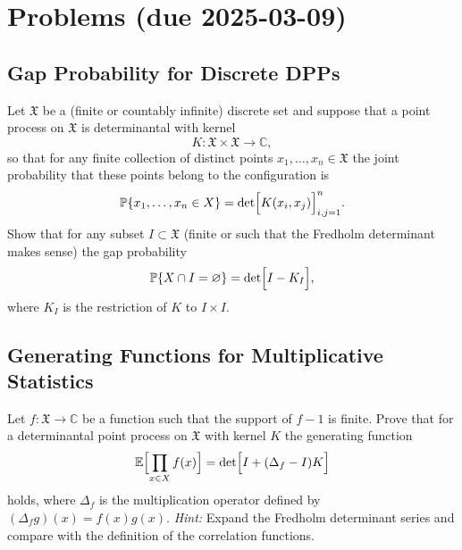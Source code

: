 \documentclass[letterpaper,11pt,oneside,reqno]{article}
\numberwithin{equation}{section}
\theoremstyle{definition}
\begin{document}






























\appendix
\setcounter{section}{4}

\section{Problems (due 2025-03-09)}


\subsection{Gap Probability for Discrete DPPs}
Let \(\mathfrak{X}\) be a (finite or countably infinite) discrete set and suppose that a point process on \(\mathfrak{X}\) is determinantal with kernel
\[
K : \mathfrak{X}\times\mathfrak{X}\to\mathbb{C},
\]
so that for any finite collection of distinct points \(x_1,\dots,x_n\in \mathfrak{X}\) the joint probability that these points belong to the configuration is
\[
\mathbb{P}\{x_1,\dots,x_n\in X\}=\det\Bigl[K(x_i,x_j)\Bigr]_{i,j=1}^n.
\]
Show that for any subset \(I\subset\mathfrak{X}\) (finite or such that the Fredholm determinant makes sense) the gap probability
\[
\mathbb{P}\{X\cap I=\varnothing\}=\det\Bigl[I-K_I\Bigr],
\]
where \(K_I\) is the restriction of \(K\) to \(I\times I\).


\subsection{Generating Functions for Multiplicative Statistics}
Let \(f:\mathfrak{X}\to\mathbb{C}\) be a function such that the support of \(f-1\) is finite. Prove that for a determinantal point process on \(\mathfrak{X}\) with kernel \(K\) the generating function
\[
\mathbb{E}\Bigl[\prod_{x\in X} f(x)\Bigr] = \det\Bigl[I+(\Delta_f-I)K\Bigr]
\]
holds, where \(\Delta_f\) is the multiplication operator defined by \((\Delta_f g)(x)=f(x)g(x)\).
\emph{Hint:} Expand the Fredholm determinant series and compare with the definition of the correlation functions.
\end{document}
